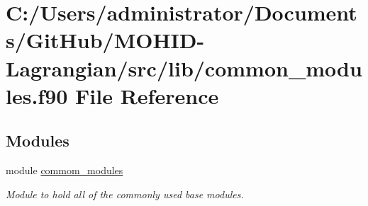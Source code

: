 \hypertarget{common__modules_8f90}{}\section{C\+:/\+Users/administrator/\+Documents/\+Git\+Hub/\+M\+O\+H\+I\+D-\/\+Lagrangian/src/lib/common\+\_\+modules.f90 File Reference}
\label{common__modules_8f90}
\subsection*{Modules}
\begin{DoxyCompactItemize}
\item 
module \hyperlink{namespacecommom__modules}{commom\+\_\+modules}
\begin{DoxyCompactList}\small\item\em Module to hold all of the commonly used base modules. \end{DoxyCompactList}\end{DoxyCompactItemize}
